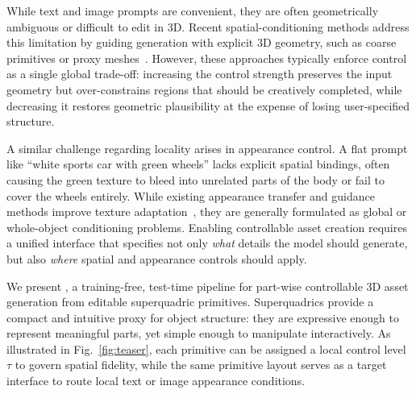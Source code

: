 While text and image prompts are convenient, they are often geometrically ambiguous or difficult to edit in 3D. Recent spatial-conditioning methods address this limitation by guiding generation with explicit 3D geometry, such as coarse primitives or proxy meshes~\cite{fedele2025spacecontrol, 10.1145/3641519.3657425, 10.1145/3641519.3657461}. However, these approaches typically enforce control as a single global trade-off: increasing the control strength preserves the input geometry but over-constrains regions that should be creatively completed, while decreasing it restores geometric plausibility at the expense of losing user-specified structure.



A similar challenge regarding locality arises in appearance control. A flat prompt like ``white sports car with green wheels'' lacks explicit spatial bindings, often causing the green texture to bleed into unrelated parts of the body or fail to cover the wheels entirely. While existing appearance transfer and guidance methods improve texture adaptation~\cite{sayandsarkar_2025_guideflow3d, 10.1145/3588432.3591503, text2mesh, Cohen-Bar_2025_CVPR}, they are generally formulated as global or whole-object conditioning problems. Enabling controllable asset creation requires a unified interface that specifies not only \textit{what} details the model should generate, but also \textit{where} spatial and appearance controls should apply.

We present \textbf{\methodname}, a training-free, test-time pipeline for part-wise controllable 3D asset generation from editable superquadric primitives. Superquadrics provide a compact and intuitive proxy for object structure: they are expressive enough to represent meaningful parts, yet simple enough to manipulate interactively. As illustrated in Fig.~\ref{fig:teaser}, each primitive can be assigned a local control level $\tau$ to govern spatial fidelity, while the same primitive layout serves as a target interface to route local text or image appearance conditions.


